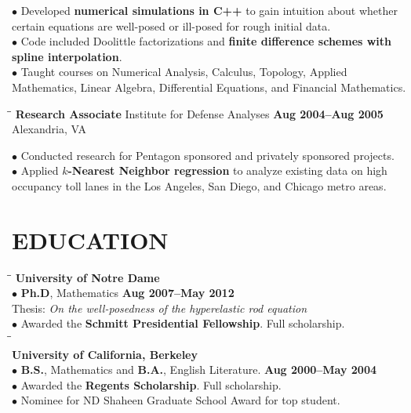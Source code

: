 \documentclass{resume}
\begin{document}
\begin{resume}
$\bullet$ Developed \textbf{numerical simulations in C++}  to gain
intuition about whether certain  equations are well-posed
or ill-posed for rough initial data. \\
$\bullet$ Code included Doolittle factorizations and \textbf{finite
difference schemes with spline interpolation}. \\
$\bullet$ Taught courses on Numerical Analysis, Calculus,
Topology, Applied Mathematics, Linear Algebra,
Differential Equations, and Financial Mathematics.
\begin{tabbing}
\hspace{2.3in}\= \hspace{2.6in}\= \kill
{\bf Research Associate } \> Institute for
Defense Analyses \>  
\textbf{Aug 2004--Aug 2005}\\
    \>Alexandria, VA
\end{tabbing}
$\bullet$ Conducted research for Pentagon sponsored and privately
sponsored projects. 
\\ 
$\bullet$ Applied \textbf{$k$-Nearest Neighbor regression} to analyze existing data on high
occupancy toll lanes in the Los
Angeles, San Diego, and
Chicago metro areas.
\section{EDUCATION} 
\vspace{-0.05mm}
\begin{tabbing}
\hspace{2.3in}\= \hspace{2.6in}\= \kill
\textbf{University of Notre Dame} \\
$\bullet$ \textbf{Ph.D}, Mathematics \>\>\textbf{Aug 2007--May 2012}
\\ 
Thesis: \textit{On the well-posedness of the hyperelastic rod equation} \\
$\bullet$ Awarded the \textbf{Schmitt Presidential Fellowship}. Full scholarship. \\
\hspace{2.3in}\= \hspace{2.6in}\= \kill
\\
\textbf{University of California, Berkeley}
\\
$\bullet$ \textbf{B.S.}, Mathematics  and  \textbf{B.A.}, English Literature.
\>\>\textbf{Aug 2000--May 2004}
\\
$\bullet$ Awarded the \textbf{Regents Scholarship}. Full scholarship.
\\
$\bullet$ Nominee for ND Shaheen Graduate School Award for top student.
\end{tabbing}

\end{resume}
\end{document}
